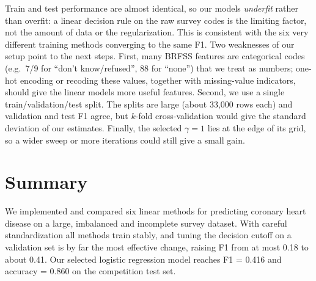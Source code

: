\documentclass[10pt,conference,compsocconf]{IEEEtran}
\begin{document}
Train and test performance are almost identical, so our models \emph{underfit}
rather than overfit: a linear decision rule on the raw survey codes is the
limiting factor, not the amount of data or the regularization. This is consistent
with the six very different training methods converging to the same F1. Two
weaknesses of our setup point to the next steps. First, many BRFSS features are
categorical codes (e.g.\ 7/9 for ``don't know/refused'', 88 for ``none'') that we
treat as numbers; one-hot encoding or recoding these values, together with
missing-value indicators, should give the linear models more useful features.
Second, we use a single train/validation/test split. The splits are large (about
33,000 rows each) and validation and test F1 agree, but $k$-fold cross-validation
would give the standard deviation of our estimates. Finally, the selected
$\gamma = 1$ lies at the edge of its grid, so a wider sweep or more iterations could
still give a small gain.

\section{Summary}

We implemented and compared six linear methods for predicting coronary heart disease
on a large, imbalanced and incomplete survey dataset. With careful standardization
all methods train stably, and tuning the decision cutoff on a validation set is by
far the most effective change, raising F1 from at most 0.18 to about 0.41. Our
selected logistic regression model reaches F1 = 0.416 and accuracy = 0.860 on the
competition test set.
\end{document}
